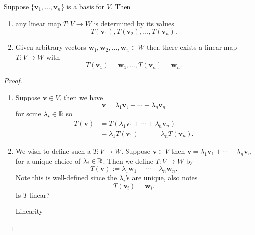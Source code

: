 \documentclass[10pt, a4paper]{article}
\newcommand{\mbf}[1]{\mathbf{#1}}
\begin{document}
\begin{lemma}
    Suppose $\{\mbf{v}_1, \dotsc, \mbf{v}_n\}$ is a basis for $V$.
    Then
    \begin{enumerate}[label = (\roman*)]
        \item any linear map $T : V \rightarrow W$ is determined by its values
        \[
        T(\mbf{v}_1), T(\mbf{v}_2), \dotsc, T(\mbf{v}_n).
        \]
        \item Given arbitrary vectors $\mbf{w}_1, \mbf{w}_2, \dotsc, \mbf{w}_n \in W$ then there exists a linear map $T : V \rightarrow W$ with
        \[
        T(\mbf{v}_1) = \mbf{w}_1, \dotsc, T(\mbf{v}_n) = \mbf{w}_n.
        \]
    \end{enumerate}
    \begin{proof}
        \begin{enumerate}[label = (\roman*)]
            \item Suppose $\mbf{v} \in V$,
            then we have
            \[
            \mbf{v} = \lambda_1\mbf{v}_1 +  \dotsi + \lambda_n\mbf{v}_n
            \]
            for some $\lambda_i \in \mathbb{R}$ so
            \begin{align*}
                T(\mbf{v}) &= T(\lambda_1\mbf{v}_1 + \dotsi + \lambda_n\mbf{v}_n) \\
                &= \lambda_1T(\mbf{v}_1) + \dotsi + \lambda_nT(\mbf{v}_n).
            \end{align*}
            \item We wish to define such a $T : V \rightarrow W$.
            Suppose $\mbf{v} \in V$ then $\mbf{v} = \lambda_1\mbf{v}_1 + \dotsi + \lambda_n\mbf{v}_n$ for a unique choice of $\lambda_i \in \mathbb{R}$.
            Then we define $T : V \rightarrow W$ by
            \[
            T(\mbf{v}) := \lambda_1\mbf{w}_1 + \dotsi + \lambda_n\mbf{w}_n.
            \]
            Note this is well-defined since the $\lambda_i$'s are unique,
            also notes
            \[
            T(\mbf{v}_i) = \mbf{w}_i.
            \]
            Is $T$ linear?

            Linearity


\end{enumerate}
\end{proof}
\end{lemma}
\end{document}
